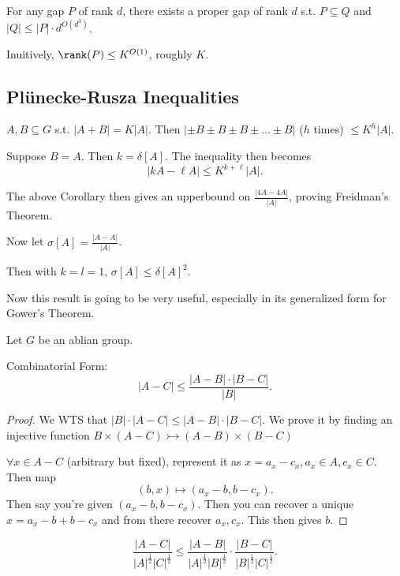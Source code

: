 \documentclass[a4paper]{article}
\begin{document}
\begin{thm}
	For any gap $P $ of rank $d $, there exists a proper gap of rank $d $ s.t. $P \subseteq Q $ and $|Q| \le |P|\cdot d^{O(d^3)}  $.
\end{thm}

Inuitively, $\rank(P) \le K^{O(1)}$, roughly $K $.

\subsection{Pl\"unecke-Rusza Inequalities}

\begin{thm}\label{thm:plunecke-rusza}
	$A,B \subseteq G $ s.t. $|A+B| = K |A| $.
	Then $|\pm B \pm B \pm B \pm \ldots \pm B |$ ($h $ times) $\le K^{h}|A|  $.
\end{thm}

\begin{cor}
	Suppose $B = A $.
	Then $k = \delta[A] $.
	The inequality then becomes
	\[
		|kA -\ell A| \le K^{k+\ell}|A|
	.\]
\end{cor}

The above Corollary then gives an upperbound on $\frac{|4A-4A|}{|A|} $, proving Freidman's Theorem.

Now let $\sigma[A] = \frac{|A-A|}{|A|} $.

\begin{cor}
	Then with $k = l = 1 $, $\sigma[A] \le \delta[A]^2$.
\end{cor}

Now this result is going to be very useful, especially in its generalized form for Gower's Theorem.

\begin{lem}
	Let $G $ be an ablian group.

	Combinatorial Form:
	\[
		|A-C| \le \frac{|A-B|\cdot |B-C|}{|B|}
	.\]
\end{lem}
\begin{proof}
	We WTS that $|B|\cdot |A-C| \le |A-B| \cdot |B-C| $.
	We prove it by finding an injective function $B\times (A-C) \rightarrowtail (A-B) \times (B-C) $

	$\forall x \in A - C $ (arbitrary but fixed), represent it as $x=a_x-c_x, a_x \in A, c_x \in C$.
	Then map
	\[
		(b,x) \mapsto (a_x-b,b-c_x)
	.\]
	Then say you're given $(a_x-b,b-c_x) $.
	Then you can recover a unique $x = a_x-b+b-c_x $ and from there recover $a_x,c_x $.
	This then gives $b $.
\end{proof}
\begin{lem}
	\[
		\frac{|A-C|}{|A|^{\frac{1}{2}}|C|^{\frac{1}{2}} } \le \frac{|A-B|}{|A|^{\frac{1}{2}}|B|^{\frac{1}{2}}  } \cdot \frac{|B-C|}{|B|^{\frac{1}{2}}|C|^{\frac{1}{2}}  }
	.\]
\end{lem}
\end{document}
